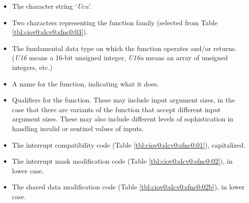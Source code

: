 \begin{itemize}
\item The character string `\emph{Ucu}'.
\item Two characters representing the function family (selected from 
      Table \ref{tbl:ciov0:slcv0:sfnc0:03}).
\item The fundamental data type on which the function operates and/or returns.  (\emph{U16} means
      a 16-bit unsigned integer, \emph{U16a} means an array of unsigned integers, etc.)
\item A name for the function, indicating what it does.
\item Qualifiers for the function.  These may include input argument sizes, in the case that
      there are variants of the function that accept different input argument sizes.  These
      may also include different levels of sophistication in handling invalid or sentinel
      values of inputs.
\item The interrupt compatibility code (Table \ref{tbl:ciov0:slcv0:sfnc0:01}), capitalized.
\item The interrupt mask modification code (Table \ref{tbl:ciov0:slcv0:sfnc0:02}), in lower case.
\item The shared data modification code (Table \ref{tbl:ciov0:slcv0:sfnc0:02b}), in lower case.
\end{itemize}

